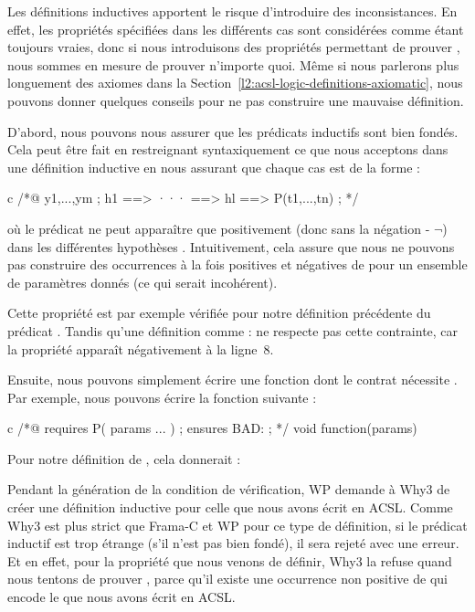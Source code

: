 Les définitions inductives apportent le risque d'introduire des inconsistances.
En effet, les propriétés spécifiées dans les différents cas sont considérées
comme étant toujours vraies, donc si nous introduisons des propriétés permettant
de prouver , nous sommes en mesure de prouver n'importe quoi.
Même si nous parlerons plus longuement des axiomes dans la
Section~\ref{l2:acsl-logic-definitions-axiomatic}, nous pouvons donner quelques
conseils pour ne pas construire une mauvaise définition.


D'abord, nous pouvons nous assurer que les prédicats inductifs sont bien fondés.
Cela peut être fait en restreignant syntaxiquement ce que nous acceptons dans
une définition inductive en nous assurant que chaque cas est de la forme :
\begin{CodeBlock}{c}
/*@
  \forall y1,...,ym ; h1 ==> ··· ==> hl ==> P(t1,...,tn) ;
*/
\end{CodeBlock}
où le prédicat  ne peut apparaître que positivement (donc sans la
négation \CodeInline{!} - $\neg$) dans les différentes hypothèses .
Intuitivement, cela assure que nous ne pouvons pas construire des occurrences à la
fois positives et négatives de  pour un ensemble de paramètres donnés
(ce qui serait incohérent).



Cette propriété est par exemple vérifiée pour notre définition précédente du
prédicat . Tandis qu'une définition comme :
ne respecte pas cette contrainte, car la propriété 
apparaît négativement à la ligne~8.


Ensuite, nous pouvons simplement écrire une fonction dont le contrat nécessite
. Par exemple, nous pouvons écrire la fonction suivante :



\begin{CodeBlock}{c}
/*@
  requires P( params ... ) ;
  ensures  BAD: \false ;
*/ void function(params){

}
\end{CodeBlock}


Pour notre définition de , cela donnerait :




Pendant la génération de la condition de vérification, WP demande à Why3 de
créer une définition inductive pour celle que nous avons écrit en ACSL.
Comme Why3 est plus strict que Frama-C et WP pour ce type de définition,
si le prédicat inductif est trop étrange (s'il n'est pas bien fondé), il
sera rejeté avec une erreur. Et en effet, pour la propriété
 que nous venons de définir, Why3 la refuse quand
nous tentons de prouver , parce
qu'il existe une occurrence non positive de 
qui encode le  que nous avons écrit en ACSL.

